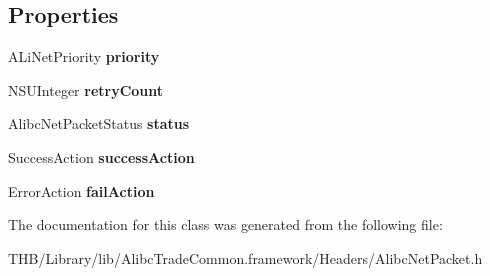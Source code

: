\subsection*{Properties}
\begin{DoxyCompactItemize}
\item 
\mbox{\label{interface_alibc_net_packet_aa65ca58ec7e238631eeb9282a9545ee9}} 
A\+Li\+Net\+Priority {\bfseries priority}
\item 
\mbox{\label{interface_alibc_net_packet_a686cd1e222a3bd542a4a77190de12eb6}} 
N\+S\+U\+Integer {\bfseries retry\+Count}
\item 
\mbox{\label{interface_alibc_net_packet_a7fc3641df9feb496b3cae2b9d33d2f9b}} 
Alibc\+Net\+Packet\+Status {\bfseries status}
\item 
\mbox{\label{interface_alibc_net_packet_a2ec0ae1b2bc545cc9cbcac165de56b69}} 
Success\+Action {\bfseries success\+Action}
\item 
\mbox{\label{interface_alibc_net_packet_a7e95280ac0a801510a1a74f44bf71365}} 
Error\+Action {\bfseries fail\+Action}
\end{DoxyCompactItemize}


The documentation for this class was generated from the following file\+:\begin{DoxyCompactItemize}
\item 
T\+H\+B/\+Library/lib/\+Alibc\+Trade\+Common.\+framework/\+Headers/Alibc\+Net\+Packet.\+h\end{DoxyCompactItemize}
